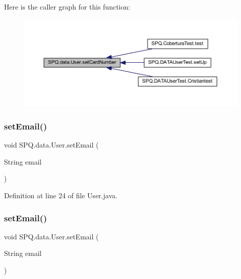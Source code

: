 Here is the caller graph for this function\+:
\nopagebreak
\begin{figure}[H]
\begin{center}
\leavevmode
\includegraphics[width=350pt]{class_s_p_q_1_1data_1_1_user_a6d98a72cb61e95f5417e10e0ba80afab_icgraph}
\end{center}
\end{figure}
\mbox{\label{class_s_p_q_1_1data_1_1_user_ab7132f971882fb88afc6999cf5473ef4}} 
\subsubsection{\texorpdfstring{set\+Email()}{setEmail()}\hspace{0.1cm}{\footnotesize\ttfamily [1/4]}}
{\footnotesize\ttfamily void S\+P\+Q.\+data.\+User.\+set\+Email (\begin{DoxyParamCaption}\item[{String}]{email }\end{DoxyParamCaption})}



Definition at line 24 of file User.\+java.

\mbox{\label{class_s_p_q_1_1data_1_1_user_ab7132f971882fb88afc6999cf5473ef4}} 
\subsubsection{\texorpdfstring{set\+Email()}{setEmail()}\hspace{0.1cm}{\footnotesize\ttfamily [2/4]}}
{\footnotesize\ttfamily void S\+P\+Q.\+data.\+User.\+set\+Email (\begin{DoxyParamCaption}\item[{String}]{email }\end{DoxyParamCaption})}



